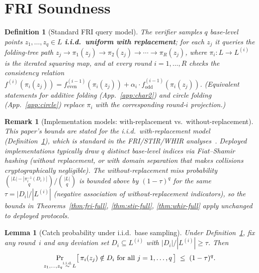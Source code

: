 \documentclass[11pt]{article}
\newtheorem{lemma}[theorem]{Lemma}
\newtheorem{definition}[theorem]{Definition}
\newtheorem{remark}[theorem]{Remark}
\begin{document}
\section{FRI Soundness}
\label{sec:soundness}

\begin{definition}[Standard FRI query model]
\label{def:query-model}
The verifier samples $q$ base-level points $z_1, \ldots, z_q \in L$ \textbf{i.i.d.\ uniform with replacement}; for each $z_j$ it queries the folding-tree path $z_j \to \pi_1(z_j) \to \pi_2(z_j) \to \cdots \to \pi_R(z_j)$, where $\pi_i: L \to L^{(i)}$ is the iterated squaring map, and at every round $i = 1, \ldots, R$ checks the consistency relation $f^{(i)}(\pi_i(z_j)) = f^{(i-1)}_{\mathrm{even}}(\pi_i(z_j)) + \alpha_i \cdot f^{(i-1)}_{\mathrm{odd}}(\pi_i(z_j))$. (Equivalent statements for additive folding (App.~\ref{app:char2}) and circle folding (App.~\ref{app:circle}) replace $\pi_i$ with the corresponding round-$i$ projection.)
\end{definition}

\begin{remark}[Implementation models: with-replacement vs.\ without-replacement]
\label{rem:query-model-impl}
This paper's bounds are stated for the i.i.d.\ with-replacement model (Definition~\ref{def:query-model}), which is standard in the FRI/STIR/WHIR analyses~\cite{BBHR,BCIKS,STIR,WHIR}. Deployed implementations typically draw $q$ \emph{distinct} base-level indices via Fiat--Shamir hashing (without replacement, or with domain separation that makes collisions cryptographically negligible). The without-replacement miss probability $\binom{|L| - |\pi_i^{-1}(D_i)|}{q}/\binom{|L|}{q}$ is bounded above by $(1-\tau)^q$ for the same $\tau = |D_i|/|L^{(i)}|$ (negative association of without-replacement indicators), so the bounds in Theorems~\ref{thm:fri-full}, \ref{thm:stir-full}, \ref{thm:whir-full} apply unchanged to deployed protocols.
\end{remark}

\begin{lemma}[Catch probability under i.i.d.\ base sampling]
\label{lem:catch-prob}
Under Definition~\ref{def:query-model}, fix any round~$i$ and any deviation set $D_i \subseteq L^{(i)}$ with $|D_i|/|L^{(i)}| \geq \tau$. Then
$$\Pr_{z_1, \ldots, z_q \stackrel{\textup{i.i.d.}}{\sim} L}\bigl[\,\pi_i(z_j) \notin D_i \text{ for all } j = 1, \ldots, q\,\bigr] \;\leq\; (1 - \tau)^q.$$
\end{lemma}
\end{document}
